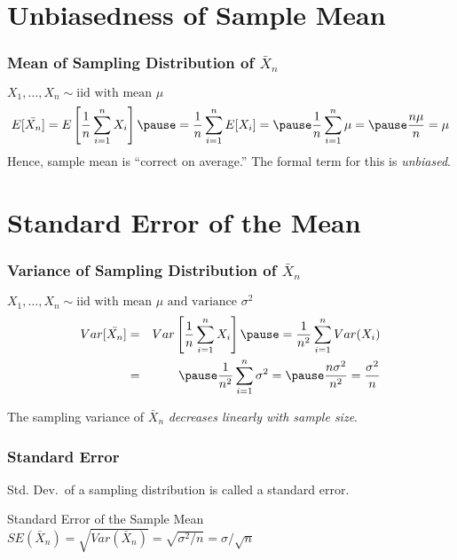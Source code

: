 \section{Unbiasedness of Sample Mean}
%
\begin{frame}
\frametitle{Mean of Sampling Distribution of $\bar{X}_n$}
\alert{$X_1, \hdots, X_n \sim \mbox{iid with mean }\mu$}
\begin{eqnarray*}
E[\bar{X_n}] = E\left[ \frac{1}{n}\sum_{i=1}^n X_i \right]\pause = \frac{1}{n} \sum_{i=1}^n E[X_i] = \pause\frac{1}{n} \sum_{i=1}^n \mu = \pause \frac{n\mu}{n} = \mu
\end{eqnarray*}
\alert{Hence, sample mean is ``correct on average.'' The formal term for this is \emph{unbiased}.}
\end{frame}

\section{Standard Error of the Mean}
%

\begin{frame}
\frametitle{Variance of Sampling Distribution of $\bar{X}_n$}
\alert{$X_1, \hdots, X_n \sim \mbox{iid with mean }\mu \mbox{ and variance } \sigma^2$}
\begin{eqnarray*}
Var[\bar{X_n}] &=& Var\left[ \frac{1}{n}\sum_{i=1}^n X_i \right] \pause= \frac{1}{n^2} \sum_{i=1}^n Var(X_i) \\
&=& \pause \frac{1}{n^2} \sum_{i=1}^n \sigma^2 = \pause \frac{n\sigma^2}{n^2} =  \frac{\sigma^2}{n}
\end{eqnarray*}

\alert{The sampling variance of $\bar{X}_n$ \emph{decreases linearly with sample size}.}
\end{frame}
\begin{frame}
\frametitle{Standard Error}
Std. Dev.\ of a sampling distribution is called a \alert{standard error}.
\begin{block}{Standard Error of the Sample Mean}
$SE(\bar{X}_n)= \sqrt{Var\left(\bar{X}_n\right)}= \sqrt{\sigma^2/n}=\sigma/\sqrt{n}$
\end{block}
\end{frame}

